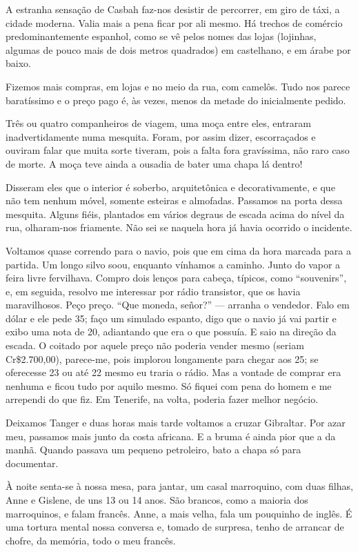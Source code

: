 A estranha sensação de Casbah faz-nos desistir de percorrer, em giro de táxi, a cidade moderna. Valia mais a pena ficar por ali mesmo. Há trechos de comércio predominantemente espanhol, como se vê pelos nomes das lojas (lojinhas, algumas de pouco mais de dois metros quadrados) em castelhano, e em árabe por baixo.

Fizemos mais compras, em lojas e no meio da rua, com camelôs. Tudo nos parece baratíssimo e o preço pago é, às vezes, menos da metade do inicialmente pedido.

Três ou quatro companheiros de viagem, uma moça entre eles, entraram inadvertidamente numa mesquita. Foram, por assim dizer, escorraçados e ouviram falar que muita sorte tiveram, pois a falta fora gravíssima, não raro caso de morte. A moça teve ainda a ousadia de bater uma chapa lá dentro!

Disseram eles que o interior é soberbo, arquitetônica e decorativamente, e que não tem nenhum móvel, somente esteiras e almofadas. Passamos na porta dessa mesquita. Alguns fiéis, plantados em vários degraus de escada acima do nível da rua, olharam-nos friamente. Não sei se naquela hora já havia ocorrido o incidente.

Voltamos quase correndo para o navio, pois que em cima da hora marcada para a partida. Um longo silvo soou, enquanto vínhamos a caminho. Junto do vapor a feira livre fervilhava. Compro dois lenços para cabeça, típicos, como ``souvenirs'', e, em seguida, resolvo me interessar por rádio transistor, que os havia maravilhosos. Peço preço. ``Que moneda, señor?'' --- arranha o vendedor. Falo em dólar e ele pede 35; faço um simulado espanto, digo que o navio já vai partir e exibo uma nota de 20, adiantando que era o que possuía. E saio na direção da escada. O coitado por aquele preço não poderia vender mesmo (seriam Cr\$2.700,00), parece-me, pois implorou longamente para chegar aos 25; se oferecesse 23 ou até 22 mesmo eu traria o rádio. Mas a vontade de comprar era nenhuma e ficou tudo por aquilo mesmo. Só fiquei com pena do homem e me arrependi do que fiz. Em Tenerife, na volta, poderia fazer melhor negócio.

Deixamos Tanger e duas horas mais tarde voltamos a cruzar Gibraltar. Por azar meu, passamos mais junto da costa africana. E a bruma é ainda pior que a da manhã. Quando passava um pequeno petroleiro, bato a chapa só para documentar.

À noite senta-se à nossa mesa, para jantar, um casal marroquino, com duas filhas, Anne e Gislene, de uns 13 ou 14 anos. São brancos, como a maioria dos marroquinos, e falam francês. Anne, a mais velha, fala um pouquinho de inglês. É uma tortura mental nossa conversa e, tomado de surpresa, tenho de arrancar de chofre, da memória, todo o meu francês.

